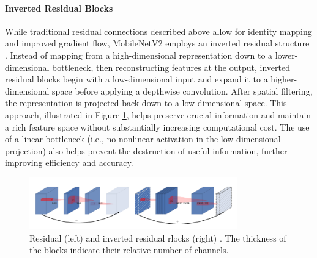 
\paragraph{Inverted Residual Blocks}
While traditional residual connections described above allow for identity mapping and improved gradient flow, MobileNetV2 employs an inverted residual structure \cite{sandler2018mobilenetv2}. Instead of mapping from a high-dimensional representation down to a lower-dimensional bottleneck, then reconstructing features at the output, inverted residual blocks begin with a low-dimensional input and expand it to a higher-dimensional space before applying a depthwise convolution. After spatial filtering, the representation is projected back down to a low-dimensional space. This approach, illustrated in Figure \ref{fig:residual}, helps preserve crucial information and maintain a rich feature space without substantially increasing computational cost. The use of a linear bottleneck (i.e., no nonlinear activation in the low-dimensional projection) also helps prevent the destruction of useful information, further improving efficiency and accuracy.  

\begin{figure}[ht]
    \centering
    \includegraphics[width=0.8\textwidth]{Images/inverted_residual.png} 
    \caption{Residual (left) and inverted residual rlocks (right) \cite{sandler2018mobilenetv2}. The thickness of the blocks indicate their relative number of channels.}
    \label{fig:residual}
\end{figure}

